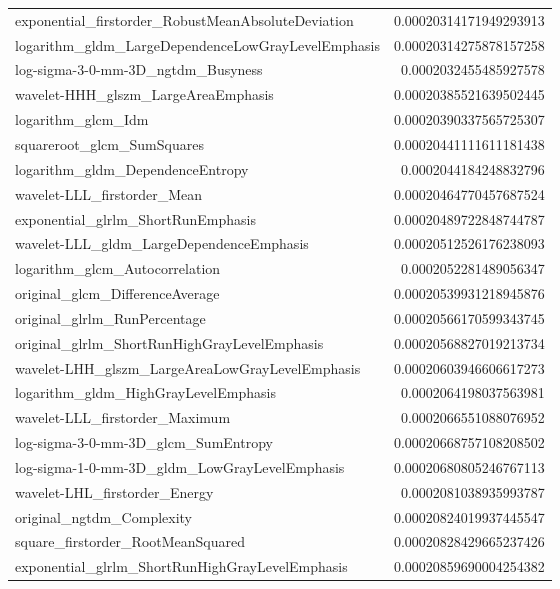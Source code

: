 {\begin{xltabular}[H]{\textwidth}{X r}
        exponential\_firstorder\_RobustMeanAbsoluteDeviation & 0.00020314171949293913 \\
        logarithm\_gldm\_LargeDependenceLowGrayLevelEmphasis & 0.00020314275878157258 \\
        log-sigma-3-0-mm-3D\_ngtdm\_Busyness & 0.0002032455485927578 \\
        wavelet-HHH\_glszm\_LargeAreaEmphasis & 0.00020385521639502445 \\
        logarithm\_glcm\_Idm & 0.00020390337565725307 \\
        squareroot\_glcm\_SumSquares & 0.00020441111611181438 \\
        logarithm\_gldm\_DependenceEntropy & 0.0002044184248832796 \\
        wavelet-LLL\_firstorder\_Mean & 0.00020464770457687524 \\
        exponential\_glrlm\_ShortRunEmphasis & 0.00020489722848744787 \\
        wavelet-LLL\_gldm\_LargeDependenceEmphasis & 0.00020512526176238093 \\
        logarithm\_glcm\_Autocorrelation & 0.0002052281489056347 \\
        original\_glcm\_DifferenceAverage & 0.00020539931218945876 \\
        original\_glrlm\_RunPercentage & 0.00020566170599343745 \\
        original\_glrlm\_ShortRunHighGrayLevelEmphasis & 0.00020568827019213734 \\
        wavelet-LHH\_glszm\_LargeAreaLowGrayLevelEmphasis & 0.00020603946606617273 \\
        logarithm\_gldm\_HighGrayLevelEmphasis & 0.0002064198037563981 \\
        wavelet-LLL\_firstorder\_Maximum & 0.0002066551088076952 \\
        log-sigma-3-0-mm-3D\_glcm\_SumEntropy & 0.00020668757108208502 \\
        log-sigma-1-0-mm-3D\_gldm\_LowGrayLevelEmphasis & 0.00020680805246767113 \\
        wavelet-LHL\_firstorder\_Energy & 0.0002081038935993787 \\
        original\_ngtdm\_Complexity & 0.00020824019937445547 \\
        square\_firstorder\_RootMeanSquared & 0.00020828429665237426 \\
        exponential\_glrlm\_ShortRunHighGrayLevelEmphasis & 0.00020859690004254382 \\

\end{xltabular}}

